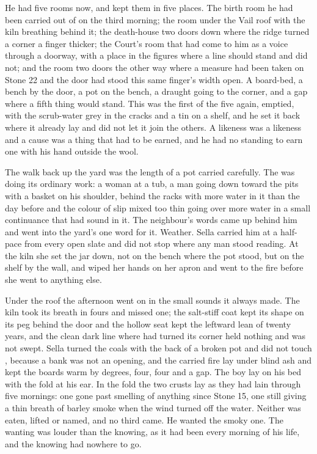 He had five rooms now, and kept them in five places. The birth room he had been carried out of on the third morning; the room under the Vail roof with the kiln breathing behind it; the death-house two doors down where the ridge turned a corner a finger thicker; the Court's room that had come to him as a voice through a doorway, with a place in the figures where a line should stand and did not; and the room two doors the other way where a measure had been taken on Stone 22 and the door had stood this same finger's width open. A board-bed, a bench by the door, a pot on the bench, a draught going to the corner, and a gap where a fifth thing would stand. This was the first of the five again, emptied, with the scrub-water grey in the cracks and a tin on a shelf, and he set it back where it already lay and did not let it join the others. A likeness was a likeness and a cause was a thing that had to be earned, and he had no standing to earn one with his hand outside the wool.

\scenebreak

The walk back up the yard was the length of a pot carried carefully. The  was doing its ordinary work: a woman at a tub, a man going down toward the pits with a basket on his shoulder,  behind the racks with more water in it than the day before and the colour of slip mixed too thin going over more water in a small continuance that had sound in it. The neighbour's words came up behind him and went into the yard's one word for it. Weather. Sella carried him at a half-pace from every open slate and did not stop where any man stood reading. At the kiln she set the jar down, not on the bench where the pot stood, but on the shelf by the wall, and wiped her hands on her apron and went to the fire before she went to anything else.

Under the  roof the afternoon went on in the small sounds it always made. The kiln took its breath in fours and missed one; the salt-stiff coat kept its shape on its peg behind the door and the hollow seat kept the leftward lean of twenty years, and the clean dark line where  had turned its corner held nothing and was not swept. Sella turned the coals with the back of a broken pot and did not touch , because a bank was not an opening, and the carried fire lay under blind ash and kept the boards warm by degrees, four, four and a gap. The boy lay on his bed with the fold at his ear. In the fold the two crusts lay as they had lain through five mornings: one gone past smelling of anything since Stone 15, one still giving a thin breath of barley smoke when the wind turned off the water. Neither was eaten, lifted or named, and no third came. He wanted the smoky one. The wanting was louder than the knowing, as it had been every morning of his life, and the knowing had nowhere to go.

